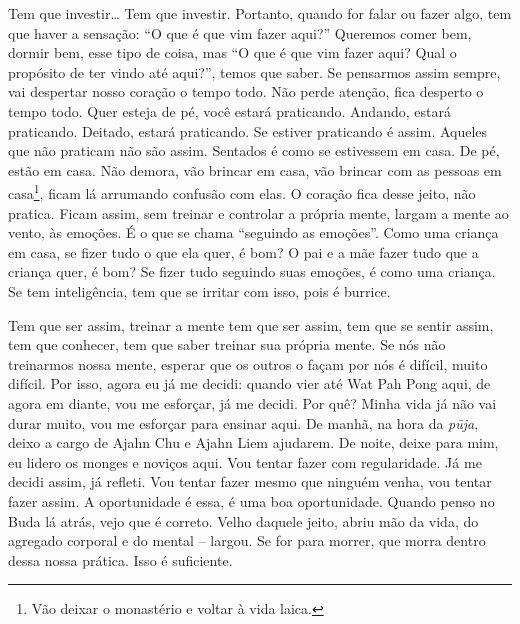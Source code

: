 Tem que investir… Tem que investir. Portanto, quando for falar ou
fazer algo, tem que haver a sensação: “O que é que vim fazer aqui?”
Queremos comer bem, dormir bem, esse tipo de coisa, mas “O que é que
vim fazer aqui? Qual o propósito de ter vindo até aqui?”, temos que
saber. Se pensarmos assim sempre, vai despertar nosso coração o tempo
todo. Não perde atenção, fica desperto o tempo todo. Quer esteja de pé,
você estará praticando. Andando, estará praticando. Deitado, estará
praticando. Se estiver praticando é assim. Aqueles que não praticam não
são assim. Sentados é como se estivessem em casa. De pé, estão em casa.
Não demora, vão brincar em casa, vão brincar com as pessoas em
casa\footnote{Vão deixar o monastério e voltar à vida laica.}, ficam lá
arrumando confusão com elas. O coração fica desse jeito, não pratica.
Ficam assim, sem treinar e controlar a própria mente, largam a mente ao
vento, às emoções. É o que se chama “seguindo as emoções”. Como uma
criança em casa, se fizer tudo o que ela quer, é bom? O pai e a mãe
fazer tudo que a criança quer, é bom? Se fizer tudo seguindo suas
emoções, é como uma criança. Se tem inteligência, tem que se irritar
com isso, pois é burrice. 

Tem que ser assim, treinar a mente tem que ser assim, tem que se
sentir assim, tem que conhecer, tem que saber treinar sua própria
mente. Se nós não treinarmos nossa mente, esperar que os outros o façam
por nós é difícil, muito difícil. Por isso, agora eu já me decidi:
quando vier até Wat Pah Pong aqui, de agora em diante, vou me esforçar,
já me decidi. Por quê? Minha vida já não vai durar muito, vou me
esforçar para ensinar aqui. De manhã, na hora da \textit{p\=uja}, deixo
a cargo de Ajahn Chu e Ajahn Liem ajudarem. De noite, deixe para mim,
eu lidero os monges e noviços aqui. Vou tentar fazer com regularidade.
Já me decidi assim, já refleti. Vou tentar fazer mesmo que ninguém
venha, vou tentar fazer assim. A oportunidade é essa, é uma boa
oportunidade. Quando penso no Buda lá atrás, vejo que é correto. Velho
daquele jeito, abriu mão da vida, do agregado corporal e do mental –
largou. Se for para morrer, que morra dentro dessa nossa prática. Isso
é suficiente.

